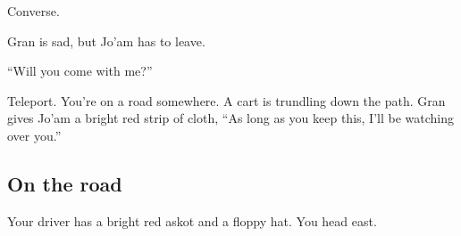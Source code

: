 \begin{multicols}{2}
Converse.

Gran is sad, but Jo'am has to leave.

``Will you come with me?''

Teleport.
You're on a road somewhere.
A cart is trundling down the path.
Gran gives Jo'am a bright red strip of cloth,
``As long as you keep this, I'll be watching over you.''

\subsection{On the road}\label{subsec:scene:OnTheRoad}
  Your driver has a bright red askot and a floppy hat.
  You head east.
\end{multicols}
